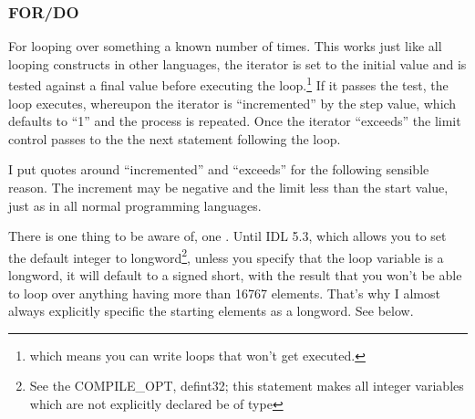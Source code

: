   \subsubsection{FOR/DO}\label{sec:qs-For-Do}

    For looping over something a known number of times. This works
    just like all looping constructs in other languages, the iterator
    is set to the initial value and is tested against a final value
    before executing the loop.\footnote{which means you can write
    loops that won't get executed.} If it passes the test, the loop
    executes, whereupon the iterator is ``incremented'' by the step
    value, which defaults to ``1'' and the process is repeated. Once
    the iterator ``exceeds'' the limit control passes to the the next
    statement following the loop.

    I put quotes around ``incremented'' and ``exceeds'' for the
    following sensible reason. The increment may be negative and the
    limit less than the start value, just as in all normal programming
    languages.
 
    There is one thing to be aware of, one . Until IDL
    5.3, which allows you to set the default integer to
    longword\footnote{See the COMPILE\_OPT, defint32; this statement
    makes all integer variables which are not explicitly declared be
    of  type}, unless you specify that the loop
    variable is a longword, it will default to a signed short, with
    the result that you won't be able to loop over anything having
    more than 16767 elements. That's why I almost always explicitly
    specific the starting elements as a longword. See below.


